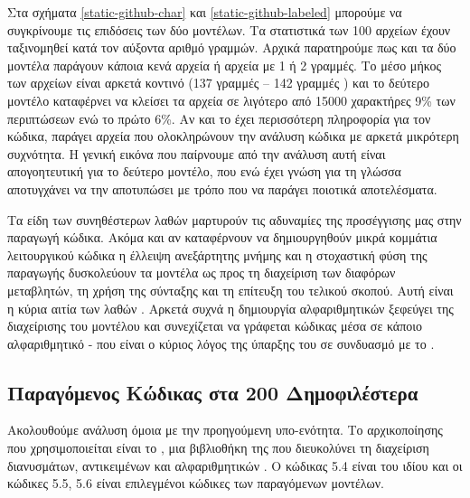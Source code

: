 Στα σχήματα \ref{static-github-char} και \ref{static-github-labeled} μπορούμε να συγκρίνουμε τις επιδόσεις των δύο μοντέλων.
Τα στατιστικά των 100 αρχείων έχουν ταξινομηθεί κατά τον αύξοντα αριθμό γραμμών.
Αρχικά παρατηρούμε πως και τα δύο μοντέλα παράγουν κάποια κενά αρχεία ή αρχεία με 1 ή 2 γραμμές.
Το μέσο μήκος των αρχείων είναι αρκετά κοντινό (137 γραμμές  -- 142 γραμμές ) και το δεύτερο μοντέλο καταφέρνει να κλείσει τα αρχεία σε λιγότερο από 15000 χαρακτήρες 9\% των περιπτώσεων ενώ το πρώτο 6\%.
Αν και το  έχει περισσότερη πληροφορία για τον κώδικα, παράγει αρχεία που ολοκληρώνουν την ανάλυση κώδικα με αρκετά μικρότερη συχνότητα.
Η γενική εικόνα που παίρνουμε από την ανάλυση αυτή είναι απογοητευτική για το δεύτερο μοντέλο, που ενώ έχει  γνώση για τη γλώσσα αποτυγχάνει να την αποτυπώσει με τρόπο που να παράγει ποιοτικά αποτελέσματα.

Τα είδη των συνηθέστερων λαθών μαρτυρούν τις αδυναμίες της προσέγγισης μας στην παραγωγή κώδικα.
Ακόμα και αν καταφέρνουν να δημιουργηθούν μικρά κομμάτια λειτουργικού κώδικα η έλλειψη ανεξάρτητης μνήμης και η στοχαστική φύση της παραγωγής δυσκολεύουν τα μοντέλα ως προς τη διαχείριση των διαφόρων μεταβλητών, τη χρήση της σύνταξης και τη επίτευξη του τελικού σκοπού.
Αυτή είναι η κύρια αιτία των λαθών .
Αρκετά συχνά η δημιουργία αλφαριθμητικών ξεφεύγει της διαχείρισης του μοντέλου και συνεχίζεται να γράφεται κώδικας μέσα σε κάποιο αλφαριθμητικό - που είναι ο κύριος λόγος της ύπαρξης του  σε συνδυασμό με το .

\subsection{Παραγόμενος Κώδικας στα 200 Δημοφιλέστερα }

Ακολουθούμε ανάλυση όμοια με την προηγούμενη υπο-ενότητα.
Το  αρχικοποίησης που χρησιμοποιείται είναι το , μια βιβλιοθήκη της  που διευκολύνει τη διαχείριση διανυσμάτων, αντικειμένων και αλφαριθμητικών . Ο κώδικας 5.4 είναι του ιδίου  και οι κώδικες 5.5, 5.6 είναι επιλεγμένοι κώδικες των παραγόμενων μοντέλων. 

\newpage
{}


